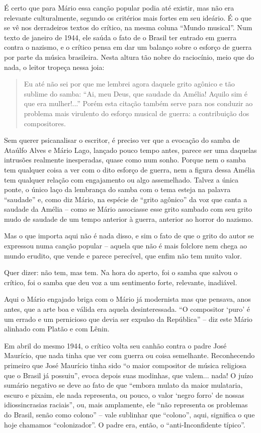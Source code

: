 É certo que para Mário essa canção popular podia até existir, mas não
era relevante culturalmente, segundo os critérios mais fortes em seu
ideário. É o que se vê nos derradeiros textos do crítico, na mesma
coluna ``Mundo musical''. Num texto de janeiro de 1944, ele saúda o fato
de o Brasil ter entrado em guerra contra o nazismo, e o crítico pensa em
dar um balanço sobre o esforço de guerra por parte da música brasileira.
Nesta altura tão nobre do raciocínio, meio que do nada, o leitor tropeça
nessa joia:

\begin{quote}
Eu até não sei por que me lembrei agora daquele grito agônico e tão
sublime do samba: ``Ai, meu Deus, que saudade da Amélia! Aquilo sim é
que era mulher!...'' Porém esta citação também serve para nos conduzir
ao problema mais virulento do esforço musical de guerra: a contribuição
dos compositores.
\end{quote}

Sem querer psicanalisar o escritor, é preciso ver que a evocação do
samba de Ataúlfo Alves e Mário Lago, lançado pouco tempo antes, parece
ser uma daquelas intrusões realmente inesperadas, quase como num sonho.
Porque nem o samba tem qualquer coisa a ver com o dito esforço de
guerra, nem a figura dessa Amélia tem qualquer relação com engajamento
ou algo assemelhado. Talvez a única ponte, o único laço da lembrança do
samba com o tema esteja na palavra ``saudade'' e, como diz Mário, na
espécie de ``grito agônico'' da voz que canta a saudade da Amélia --
como se Mário associasse esse grito sambado com seu grito mudo de
saudade de um tempo anterior à guerra, anterior ao horror do nazismo.

Mas o que importa aqui não é nada disso, e sim o fato de que o grito do
autor se expressou numa canção popular -- aquela que não é mais folclore
nem chega ao mundo erudito, que vende e parece perecível, que enfim não
tem muito valor.

Quer dizer: não tem, mas tem. Na hora do aperto, foi o samba que salvou
o crítico, foi o samba que deu voz a um sentimento forte, relevante,
inadiável.

Aqui o Mário engajado briga com o Mário já modernista mas que pensava,
anos antes, que a arte boa e válida era aquela desinteressada. ``O
compositor `puro' é um errado e um pernicioso que devia ser expulso da
República'' -- diz este Mário alinhado com Platão e com Lênin.

Em abril do mesmo 1944, o crítico volta seu canhão contra o padre José
Maurício, que nada tinha que ver com guerra ou coisa semelhante.
Reconhecendo primeiro que José Maurício tinha sido ``o maior compositor
de música religiosa que o Brasil já possuiu'', evoca depois suas
modinhas, que valem... nada! O juízo sumário negativo se deve ao fato de
que ``embora mulato da maior mulataria, escuro e pixaim, ele nada
representa, ou pouco, o valor `negro forro' de nossas idiossincrasias
raciais'', ou, mais amplamente, ele ``não representa os problemas do
Brasil, senão como colono'' -- vale sublinhar que ``colono'', aqui,
significa o que hoje chamamos ``colonizador''. O padre era, então, o
``anti-Inconfidente típico''.

